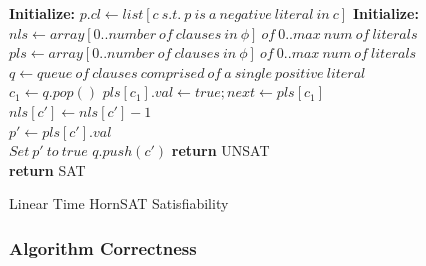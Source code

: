 \documentclass{article}
\begin{document}
\begin{algorithm}
  \begin{algorithmic}[1]
           
              \State \textbf{Initialize:}
              \State $p.cl \gets list[c~s.t.~p~is~a~negative~literal~in~c]$ 
          \EndFor
          \State \textbf{Initialize:}
          \State $nls \gets array[0..number~of~clauses~in~\phi]~of~0..max~num~of~literals$
          \State $pls \gets array[0..number~of~clauses~in~\phi]~of~0..max~num~of~literals$
          \State $q \gets queue~of~clauses~comprised~of~a~single~positive~literal$
          \\
                \State $c_1 \gets q.pop()$
                \State $pls[c_1].val \gets true; next \gets pls[c_1]$
                \\
                 
                  \State $nls[c'] \gets nls[c'] - 1$ 
                  \\
                   
                    \State $p' \gets pls[c'].val$
                    \\
                      \State $Set~p'~to~true$
                      \State $q.push(c')$ 
                    \Else
                      \State \textbf{return} UNSAT
                    \EndIf
                  \EndIf
                \EndFor
              \EndFor
          \EndWhile
          \\
          \State \textbf{return} SAT 
      \EndProcedure
  \end{algorithmic}
  \caption{Linear Time HornSAT Satisfiability}
  \label{fig:linear-horn}
\end{algorithm}

\subsubsection{Algorithm Correctness}
\end{document}
